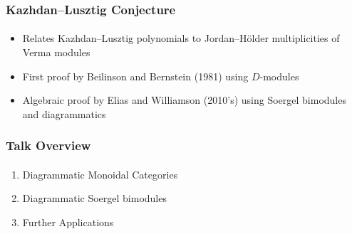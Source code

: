 
\begin{frame}
    \frametitle{Kazhdan--Lusztig Conjecture}
    \framesubtitle{}

    \begin{itemize}
        \item Relates Kazhdan--Lusztig polynomials to Jordan--H\"older multiplicities of Verma modules
        \item First proof by Beilinson and Bernstein (1981) using $D$-modules
        \item Algebraic proof by Elias and Williamson (2010's) using Soergel bimodules and diagrammatics
    \end{itemize}
\end{frame}

\begin{frame}
    \frametitle{Talk Overview}
    \framesubtitle{}

    \begin{enumerate}
        \item Diagrammatic Monoidal Categories
        \item Diagrammatic Soergel bimodules
        \item Further Applications
    \end{enumerate}
\end{frame}
